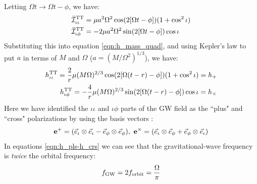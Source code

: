Letting $\Omega t \rightarrow \Omega t - \phi$, we have:
\begin{align}
\ddot{\mathcal{I}}^{\mathrm{TT}}_{\iota\iota} &= \mu a^2 \Omega^2 \cos(2[\Omega t - \phi])(1 + \cos^2\iota) \\
\ddot{\mathcal{I}}^{\mathrm{TT}}_{\iota\phi}  &= -2 \mu a^2 \Omega^2 \sin(2[\Omega t - \phi])\cos\iota
\end{align}
Substituting this into equation \ref{eqn:h_mass_quad}, and using Kepler's law to put $a$ in terms of $M$ and $\Omega$ ($a = \left(M/\Omega^2\right)^{1/3}$), we have:
\begin{subequations}
\label{eqn:h_pls-h_crs}
\begin{align}
h^{\mathrm{TT}}_{\iota\iota} = \frac{2}{r}\mu (M \Omega)^{2/3} \cos(2[\Omega (t-r) - \phi])(1 + \cos^2\iota) = h_{+} \\
h^{\mathrm{TT}}_{\iota\phi}  = -\frac{4}{r} \mu (M\Omega)^{2/3} \sin(2[\Omega (t-r) - \phi])\cos\iota = h_{\times}
\end{align}
\end{subequations}
Here we have identified the $\iota\iota$ and $\iota\phi$ parts of the \ac{GW} field as the ``plus" and ``cross" polarizations by using the basis vectors \cite{BlanfordThorne}:
\begin{equation}
\mathbf{e}^{+} = (\vec{e}_{\iota} \otimes \vec{e}_{\iota} - \vec{e}_{\phi} \otimes \vec{e}_{\phi}), ~ \mathbf{e}^{\times} = (\vec{e}_{\iota} \otimes \vec{e}_{\phi} + \vec{e}_{\phi} \otimes \vec{e}_{\iota})
\end{equation}
In equations \ref{eqn:h_pls-h_crs} we can see that the gravitational-wave frequency is \emph{twice} the orbital frequency:
\begin{equation}
\label{eqn:f_GW}
\fGW = 2 f_{\mathrm{orbit}} = \frac{\Omega}{\pi}
\end{equation}

